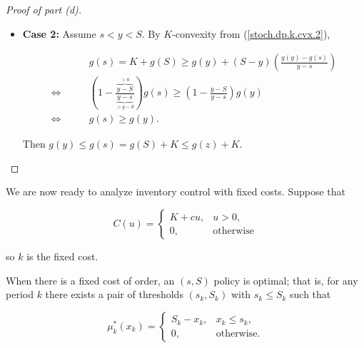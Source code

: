 \begin{proof}[Proof of part (d)]
\begin{enumerate}[(1)]
\begin{itemize}
\item \textbf{Case 2:} Assume \(s < y < S\). By \(K\)-convexity from (\ref{stoch.dp.k.cvx.2}),

\begin{align*}
& g(s) = K + g(S) \geq g(y) + (S- y) \left( \frac{g(y) - g(s)}{y - s} \right) \\
\iff \qquad &  \left( 1 - \frac{\overbrace{y -S}^{>0} }{\underbrace{y-s}_{> y - S}} \right) g(s) \geq   \left( 1 - \frac{y -S }{y-s} \right) g(y) 
\\ \iff  \qquad & g(s) \geq g(y)  .
\end{align*}

Then \(g(y) \leq g(s) = g(S) + K \leq g(z) + K\).

\end{itemize}

\end{enumerate}

\end{proof}


We are now ready to analyze inventory control with fixed costs. Suppose that 

\[
C(u) = \begin{cases}
K + cu, & u > 0, \\
0, & \text{otherwise}
\end{cases}
\]

so \(k\) is the fixed cost. 

\begin{theorem}\label{stoch.dp.them.opt.fix.cost}



When there is a fixed cost of order, an \((s, S)\) policy is optimal; that is, for any period \(k\) there exists a pair of thresholds \((s_k, S_k)\) with \(s_k \leq S_k\) such that 

\begin{equation}\label{dp.fixed.costs.inv.opt.policy}
\mu_k^*(x_k) = \begin{cases}
S_k - x_k, & x_k \leq s_k, \\
0, & \text{otherwise.}
\end{cases}
\end{equation}

\end{theorem}

